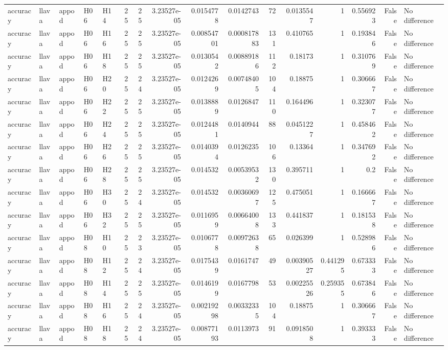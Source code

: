 \begin{longtable}{lllllrrrrrrrrrrl}
accuracy & llava & appod & H06 & H14 & 25 & 25 & 3.23527e-05 & 0.0154778 & 0.0142743 & 72 & 0.0135547 & 1 & 0.556923 & False & No difference \\
accuracy & llava & appod & H06 & H16 & 25 & 25 & 3.23527e-05 & 0.00854701 & 0.000817883 & 131 & 0.410765 & 1 & 0.193846 & False & No difference \\
accuracy & llava & appod & H06 & H18 & 25 & 25 & 3.23527e-05 & 0.0130542 & 0.00889186 & 112 & 0.18173 & 1 & 0.310769 & False & No difference \\
accuracy & llava & appod & H06 & H20 & 25 & 24 & 3.23527e-05 & 0.0124269 & 0.00748405 & 104 & 0.18875 & 1 & 0.306667 & False & No difference \\
accuracy & llava & appod & H06 & H22 & 25 & 25 & 3.23527e-05 & 0.0138889 & 0.0126847 & 110 & 0.164496 & 1 & 0.323077 & False & No difference \\
accuracy & llava & appod & H06 & H24 & 25 & 25 & 3.23527e-05 & 0.0124481 & 0.0140944 & 88 & 0.0451227 & 1 & 0.458462 & False & No difference \\
accuracy & llava & appod & H06 & H26 & 25 & 25 & 3.23527e-05 & 0.0140394 & 0.0126235 & 106 & 0.13364 & 1 & 0.347692 & False & No difference \\
accuracy & llava & appod & H06 & H28 & 25 & 25 & 3.23527e-05 & 0.014532 & 0.00539532 & 130 & 0.395711 & 1 & 0.2 & False & No difference \\
accuracy & llava & appod & H06 & H30 & 25 & 24 & 3.23527e-05 & 0.014532 & 0.00360697 & 125 & 0.475051 & 1 & 0.166667 & False & No difference \\
accuracy & llava & appod & H06 & H32 & 25 & 25 & 3.23527e-05 & 0.0116959 & 0.00664008 & 133 & 0.441837 & 1 & 0.181538 & False & No difference \\
accuracy & llava & appod & H08 & H10 & 25 & 23 & 3.23527e-05 & 0.0106778 & 0.00972638 & 65 & 0.026399 & 1 & 0.528986 & False & No difference \\
accuracy & llava & appod & H08 & H12 & 25 & 24 & 3.23527e-05 & 0.0175439 & 0.0161747 & 49 & 0.00390527 & 0.441295 & 0.673333 & False & No difference \\
accuracy & llava & appod & H08 & H14 & 25 & 25 & 3.23527e-05 & 0.0146199 & 0.0167798 & 53 & 0.00225526 & 0.259355 & 0.673846 & False & No difference \\
accuracy & llava & appod & H08 & H16 & 25 & 24 & 3.23527e-05 & 0.00219298 & 0.00332335 & 104 & 0.18875 & 1 & 0.306667 & False & No difference \\
accuracy & llava & appod & H08 & H18 & 25 & 24 & 3.23527e-05 & 0.00877193 & 0.0113973 & 91 & 0.0918508 & 1 & 0.393333 & False & No difference \\

\end{longtable}
